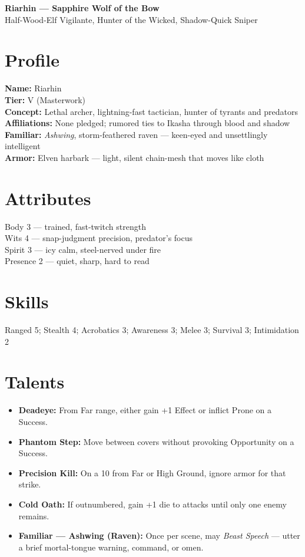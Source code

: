 \documentclass[11pt]{article}
\begin{document}
\begin{center}
{\LARGE \textbf{Riarhin --- Sapphire Wolf of the Bow}}\\[4pt]
{\large Half-Wood-Elf Vigilante, Hunter of the Wicked, Shadow-Quick Sniper}
\end{center}

\section*{Profile}
\textbf{Name:} Riarhin\\
\textbf{Tier:} V (Masterwork)\\
\textbf{Concept:} Lethal archer, lightning-fast tactician, hunter of tyrants and predators\\
\textbf{Affiliations:} None pledged; rumored ties to Ikasha through blood and shadow\\
\textbf{Familiar:} \emph{Ashwing}, storm-feathered raven --- keen-eyed and unsettlingly intelligent\\
\textbf{Armor:} Elven harbark --- light, silent chain-mesh that moves like cloth

\section*{Attributes}
Body 3 --- trained, fast-twitch strength\\
Wits 4 --- snap-judgment precision, predator's focus\\
Spirit 3 --- icy calm, steel-nerved under fire\\
Presence 2 --- quiet, sharp, hard to read

\section*{Skills}
Ranged 5; Stealth 4; Acrobatics 3; Awareness 3; Melee 3; Survival 3; Intimidation 2

\section*{Talents}
\begin{itemize}
  \item \textbf{Deadeye:} From Far range, either gain +1 Effect or inflict Prone on a Success.
  \item \textbf{Phantom Step:} Move between covers without provoking Opportunity on a Success.
  \item \textbf{Precision Kill:} On a 10 from Far or High Ground, ignore armor for that strike.
  \item \textbf{Cold Oath:} If outnumbered, gain +1 die to attacks until only one enemy remains.
  \item \textbf{Familiar --- Ashwing (Raven):} Once per scene, may \emph{Beast Speech} --- utter a brief mortal-tongue warning, command, or omen.
\end{itemize}
\end{document}
